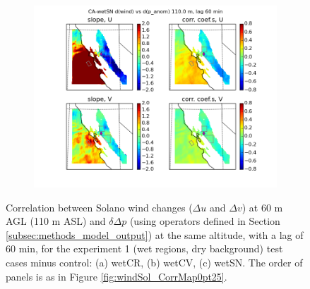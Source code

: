 \begin{figure}[here]
\begin{subfigure}{0.5\textwidth}
\includegraphics[width=\textwidth]{ch3-wind/img/corr_dwind_dpanom_lev110_lag2_wetSN.png}
\caption{}
\end{subfigure}
\caption{Correlation between Solano wind changes ($\Delta u$ and $\Delta v$) at 60 m AGL (110 m ASL) and $\delta \Delta p$ (using operators defined in Section \ref{subsec:methods_model_output}) at the same altitude, with a lag of 60 min, for the experiment 1 (wet regions, dry background) test cases minus control: (a) wetCR, (b) wetCV, (c) wetSN.  The order of panels is as in Figure \ref{fig:windSol_CorrMap0pt25}.}
\label{fig:windSol_CorrMapWetRg}
\end{figure}

